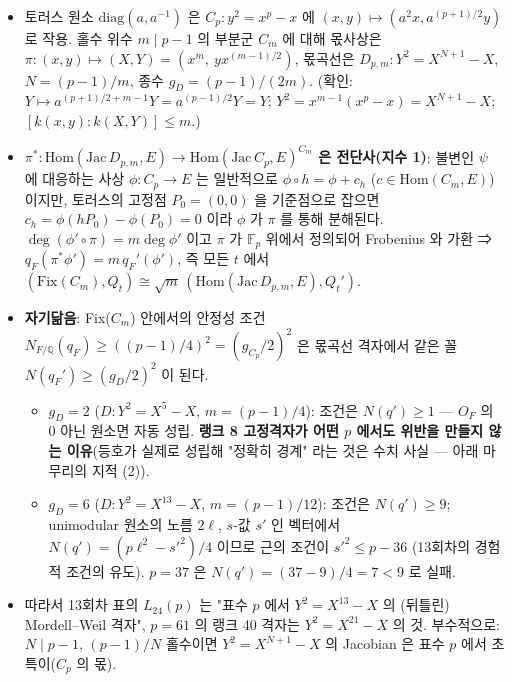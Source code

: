 \begin{itemize}
\tightlist
\item
  토러스 원소 \(\mathrm{diag}(a,a^{-1})\) 은 \(C_p:y^2=x^p-x\) 에 \((x,y)\mapsto(a^2x,a^{(p+1)/2}y)\) 로 작용. 홀수 위수 \(m\mid p-1\) 의 부분군 \(C_m\) 에 대해 몫사상은 \(\pi:(x,y)\mapsto(X,Y)=(x^m,\ yx^{(m-1)/2})\), 몫곡선은 \(D_{p,m}:Y^2=X^{N+1}-X\), \(N=(p-1)/m\), 종수 \(g_D=(p-1)/(2m)\). (확인: \(Y\mapsto a^{(p+1)/2+m-1}Y=a^{(p-1)/2}Y=Y\); \(Y^2=x^{m-1}(x^p-x)=X^{N+1}-X\); \([k(x,y):k(X,Y)]\le m\).)
\item
  \textbf{\(\pi^*:\mathrm{Hom}(\mathrm{Jac}\,D_{p,m},E)\to\mathrm{Hom}(\mathrm{Jac}\,C_p,E)^{C_m}\) 은 전단사(지수 1)}: 불변인 \(\psi\) 에 대응하는 사상 \(\phi:C_p\to E\) 는 일반적으로 \(\phi\circ h=\phi+c_h\) (\(c\in\mathrm{Hom}(C_m,E)\))이지만, 토러스의 고정점 \(P_0=(0,0)\) 을 기준점으로 잡으면 \(c_h=\phi(hP_0)-\phi(P_0)=0\) 이라 \(\phi\) 가 \(\pi\) 를 통해 분해된다. \(\deg(\phi'\circ\pi)=m\deg\phi'\) 이고 \(\pi\) 가 \(\mathbb F_p\) 위에서 정의되어 Frobenius 와 가환 ⇒ \(q_F(\pi^*\phi')=m\,q_F'(\phi')\), 즉 모든 \(t\) 에서 \((\mathrm{Fix}(C_m),Q_t)\cong\sqrt m\,(\mathrm{Hom}(\mathrm{Jac}\,D_{p,m},E),Q_t')\).
\item
  \textbf{자기닮음}: Fix(\(C_m\)) 안에서의 안정성 조건 \(N_{F/\mathbb Q}(q_F)\ge((p-1)/4)^2=(g_{C_p}/2)^2\) 은 몫곡선 격자에서 같은 꼴 \(N(q_F')\ge(g_D/2)^2\) 이 된다.

  \begin{itemize}
  \tightlist
  \item
    \(g_D=2\) (\(D:Y^2=X^5-X\), \(m=(p-1)/4\)): 조건은 \(N(q')\ge1\) --- \(O_F\) 의 0 아닌 원소면 자동 성립. \textbf{랭크 8 고정격자가 어떤 \(p\) 에서도 위반을 만들지 않는 이유}(등호가 실제로 성립해 "정확히 경계" 라는 것은 수치 사실 --- 아래 마무리의 지적 (2)).
  \item
    \(g_D=6\) (\(D:Y^2=X^{13}-X\), \(m=(p-1)/12\)): 조건은 \(N(q')\ge9\); unimodular 원소의 노름 \(2\ell\), \(s\)-값 \(s'\) 인 벡터에서 \(N(q')=(p\ell^2-s'^2)/4\) 이므로 근의 조건이 \(s'^2\le p-36\) (13회차의 경험적 조건의 유도). \(p=37\) 은 \(N(q')=(37-9)/4=7<9\) 로 실패.
  \end{itemize}
\item
  따라서 13회차 표의 \(L_{24}(p)\) 는 "표수 \(p\) 에서 \(Y^2=X^{13}-X\) 의 (뒤틀린) Mordell--Weil 격자", \(p=61\) 의 랭크 40 격자는 \(Y^2=X^{21}-X\) 의 것. 부수적으로: \(N\mid p-1\), \((p-1)/N\) 홀수이면 \(Y^2=X^{N+1}-X\) 의 Jacobian 은 표수 \(p\) 에서 초특이(\(C_p\) 의 몫).
\end{itemize}

